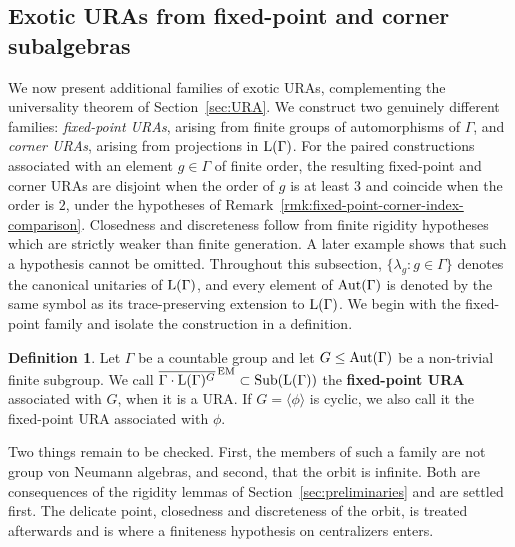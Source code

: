 \documentclass[12pt]{amsart} %
\theoremstyle{plain}
\theoremstyle{definition}
\newtheorem{definition}[theorem]{Definition}
\newcommand{\LL}{{\rm L}}
\newcommand{\Aut}{{\rm Aut}}
\DeclareMathOperator{\Sub}{Sub}
\begin{document}
\subsection{Exotic URAs from fixed-point and corner subalgebras}
\label{subsec:exoticURAs}
We now present additional families of exotic URAs, complementing the
universality theorem of Section~\ref{sec:URA}. We construct two genuinely
different families: \emph{fixed-point URAs}, arising from finite groups of
automorphisms of $\Gamma$, and \emph{corner URAs}, arising from projections in
$\LL(\Gamma)$. For the paired constructions associated with an
element $g\in\Gamma$ of finite order, the resulting fixed-point and corner
URAs are disjoint when the order of $g$ is at least $3$ and coincide when
the order is $2$, under the hypotheses of
Remark~\ref{rmk:fixed-point-corner-index-comparison}. Closedness and discreteness
follow from finite rigidity hypotheses which are strictly weaker than finite
generation. A later example shows that such a hypothesis cannot be omitted.
Throughout this subsection, $\{\lambda_g:g\in\Gamma\}$ denotes the
canonical unitaries of $\LL(\Gamma)$, and every element of
$\Aut(\Gamma)$ is denoted by the same symbol as its trace-preserving
extension to $\LL(\Gamma)$.
\medskip
\noindent We begin with the fixed-point family and isolate the construction in a
definition.
\begin{definition}\label{def:fixed-point-ura}
Let $\Gamma$ be a countable group and let
$G\leq\Aut(\Gamma)$ be a non-trivial finite subgroup. We call
$\overline{\Gamma\cdot \LL(\Gamma)^G}^{\,\mathrm{EM}}\subset\Sub(\LL(\Gamma))$ the
\textbf{fixed-point URA} associated with $G$, when it is a URA. If
$G=\langle\phi\rangle$ is cyclic, we also call it the fixed-point URA
associated with $\phi$.
\end{definition}

\noindent Two things remain to be checked. First, the members of such a family are not group von
Neumann algebras, and second, that the orbit is infinite. Both are consequences of the
rigidity lemmas of Section~\ref{sec:preliminaries} and are settled first. The
delicate point, closedness and discreteness of the orbit, is treated afterwards
and is where a finiteness hypothesis on centralizers enters.
\medskip
\end{document}
